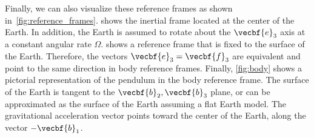 \documentclass[11pt, reqno]{article}   	%
\begin{document}
Finally, we can also visualize these reference frames as shown in~\cref{fig:reference_frames}.
 shows the inertial frame located at the center of the Earth.
In addition, the Earth is assumed to rotate about the \( \vecbf{e}_3 \) axis at a constant angular rate \( \Omega \).
 shows a reference frame that is fixed to the surface of the Earth. 
Therefore, the vectors \( \vecbf{e}_3 = \vecbf{f}_3\) are equivalent and point to the same direction in body reference frames.
Finally, \cref{fig:body} shows a pictorial representation of the pendulum in the body reference frame. 
The surface of the Earth is tangent to the \( \vecbf{b}_2, \vecbf{b}_3 \) plane, or can be approximated as the surface of the Earth assuming a flat Earth model.
The gravitational acceleration vector points toward the center of the Earth, along the vector \( -\vecbf{b}_1 \).
\end{document}
